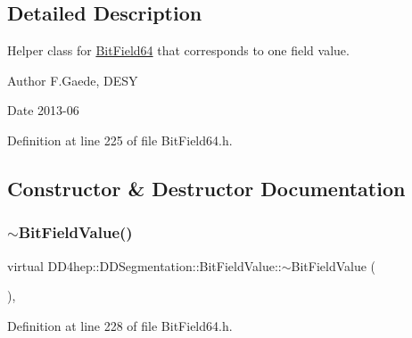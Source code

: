 \subsection{Detailed Description}
Helper class for \hyperlink{class_d_d4hep_1_1_d_d_segmentation_1_1_bit_field64}{Bit\+Field64} that corresponds to one field value. \begin{DoxyAuthor}{Author}
F.\+Gaede, D\+E\+SY 
\end{DoxyAuthor}
\begin{DoxyDate}{Date}
2013-\/06 
\end{DoxyDate}


Definition at line 225 of file Bit\+Field64.\+h.



\subsection{Constructor \& Destructor Documentation}
\hypertarget{class_d_d4hep_1_1_d_d_segmentation_1_1_bit_field_value_a182cf1a9ae2449b88fb89f37bba2abb7}{}\label{class_d_d4hep_1_1_d_d_segmentation_1_1_bit_field_value_a182cf1a9ae2449b88fb89f37bba2abb7} 
\subsubsection{\texorpdfstring{$\sim$\+Bit\+Field\+Value()}{~BitFieldValue()}}
{\footnotesize\ttfamily virtual D\+D4hep\+::\+D\+D\+Segmentation\+::\+Bit\+Field\+Value\+::$\sim$\+Bit\+Field\+Value (\begin{DoxyParamCaption}{ }\end{DoxyParamCaption})\hspace{0.3cm}{\ttfamily [inline]}, {\ttfamily [virtual]}}



Definition at line 228 of file Bit\+Field64.\+h.

\hypertarget{class_d_d4hep_1_1_d_d_segmentation_1_1_bit_field_value_aa8ff52eb2b15cd6a50d6db56b658c80e}{}\label{class_d_d4hep_1_1_d_d_segmentation_1_1_bit_field_value_aa8ff52eb2b15cd6a50d6db56b658c80e} 
